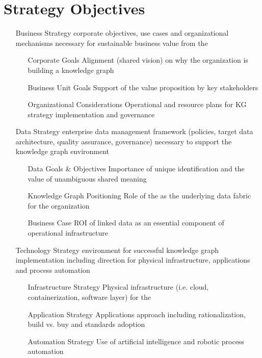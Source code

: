 \section{Strategy Objectives}
%
%
\begin{itemize}[leftmargin=2in,font=\bfseries]
  \item [Business Strategy] corporate objectives, use cases and organizational mechanisms necessary for sustainable business value from the 
  \begin{itemize}[labelwidth=1.5in,leftmargin=0in]
    \item [Corporate Goals] Alignment (shared vision) on why the organization is building a knowledge graph
    \item [Business Unit Goals] Support of the  value proposition by key  stakeholders
    \item [Organizational Considerations] Operational and resource plans for KG strategy implementation and governance
  \end{itemize}
  \item [Data Strategy] enterprise data management framework (policies, target data architecture, quality assurance, governance) necessary to support the knowledge graph environment
    \begin{itemize}[labelwidth=1.5in,leftmargin=0in]
      \item [Data Goals \& Objectives] Importance of unique identification and the value of unambiguous shared meaning
      \item [Knowledge Graph Positioning] Role of the  as the underlying data fabric for the organization
      \item [Business Case] ROI of linked data as an essential component of operational infrastructure
    \end{itemize}
  \item [Technology Strategy] environment for successful knowledge graph implementation including direction for physical infrastructure, applications and process automation
    \begin{itemize}[labelwidth=1.5in,leftmargin=0in]
      \item [Infrastructure Strategy] Physical infrastructure (i.e. cloud, containerization, software layer) for the 
      \item [Application Strategy] Applications approach including rationalization, build vs. buy and standards adoption
      \item [Automation Strategy] Use of artificial intelligence and robotic process automation
    \end{itemize}
\end{itemize}

